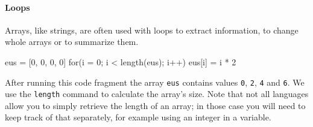 \paragraph{Loops}

Arrays, like strings, are often used with loops to extract information, to change whole arrays or to summarize them.

\begin{nnflisting}
eus = [0, 0, 0, 0]
for(i = 0; i < length(eus); i++)
    eus[i] = i * 2
\end{nnflisting}

After running this code fragment the array \texttt{eus} contains values \texttt{0}, \texttt{2}, \texttt{4} and \texttt{6}. We use the \texttt{length} command to calculate the array's size. Note that not all languages allow you to simply retrieve the length of an array; in those case you will need to keep track of that separately, for example using an integer in a variable.
